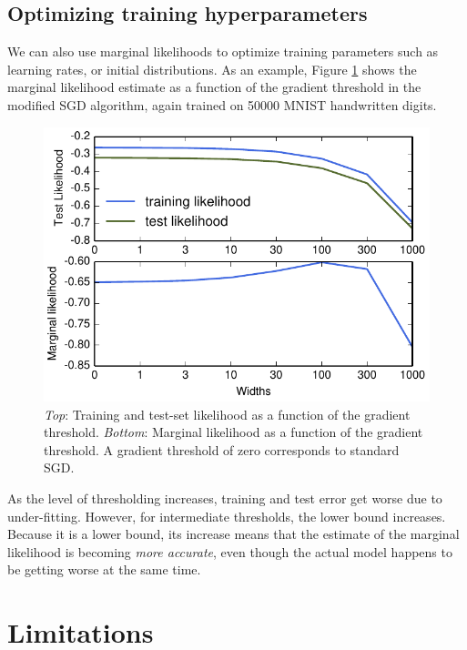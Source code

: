 \documentclass[]{article}
\begin{document}
\subsection{Optimizing training hyperparameters}

We can also use marginal likelihoods to optimize training parameters such as learning rates, or initial distributions.
As an example, Figure \ref{fig:threshold} shows the marginal likelihood estimate as a function of the gradient threshold in the modified SGD algorithm, again trained on 50000 MNIST handwritten digits.

\begin{figure}[h!]
\begin{center}
\includegraphics[width=\columnwidth]{../experiments/2015_03_03_vary_width/5_grad_threshold/vary_widths.pdf}
\vskip -0.1in
\caption{\emph{Top}: Training and test-set likelihood as a function of the gradient threshold.
\emph{Bottom}: Marginal likelihood as a function of the gradient threshold.
A gradient threshold of zero corresponds to standard SGD.}
\label{fig:threshold}
\end{center}
\end{figure}

As the level of thresholding increases, training and test error get worse due to under-fitting.
However, for intermediate thresholds, the lower bound increases.
Because it is a lower bound, its increase means that the estimate of the marginal likelihood is becoming \emph{more accurate}, even though the actual model happens to be getting worse at the same time.



\section{Limitations}
\end{document}
